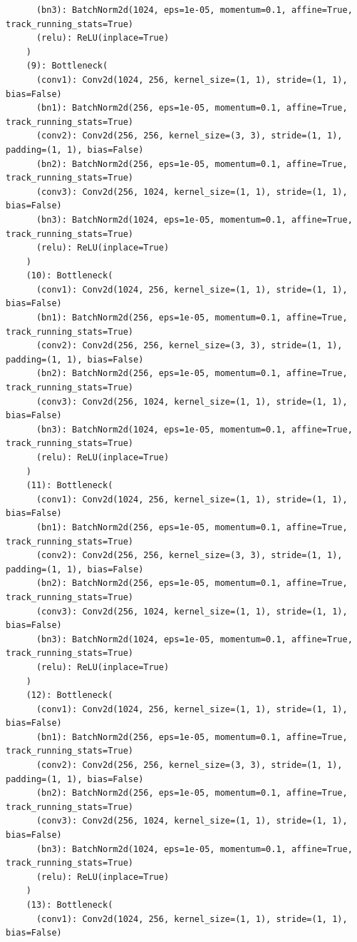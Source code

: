 \documentclass{article}
\begin{document}
\begin{verbatim}
      (bn3): BatchNorm2d(1024, eps=1e-05, momentum=0.1, affine=True, track_running_stats=True)
      (relu): ReLU(inplace=True)
    )
    (9): Bottleneck(
      (conv1): Conv2d(1024, 256, kernel_size=(1, 1), stride=(1, 1), bias=False)
      (bn1): BatchNorm2d(256, eps=1e-05, momentum=0.1, affine=True, track_running_stats=True)
      (conv2): Conv2d(256, 256, kernel_size=(3, 3), stride=(1, 1), padding=(1, 1), bias=False)
      (bn2): BatchNorm2d(256, eps=1e-05, momentum=0.1, affine=True, track_running_stats=True)
      (conv3): Conv2d(256, 1024, kernel_size=(1, 1), stride=(1, 1), bias=False)
      (bn3): BatchNorm2d(1024, eps=1e-05, momentum=0.1, affine=True, track_running_stats=True)
      (relu): ReLU(inplace=True)
    )
    (10): Bottleneck(
      (conv1): Conv2d(1024, 256, kernel_size=(1, 1), stride=(1, 1), bias=False)
      (bn1): BatchNorm2d(256, eps=1e-05, momentum=0.1, affine=True, track_running_stats=True)
      (conv2): Conv2d(256, 256, kernel_size=(3, 3), stride=(1, 1), padding=(1, 1), bias=False)
      (bn2): BatchNorm2d(256, eps=1e-05, momentum=0.1, affine=True, track_running_stats=True)
      (conv3): Conv2d(256, 1024, kernel_size=(1, 1), stride=(1, 1), bias=False)
      (bn3): BatchNorm2d(1024, eps=1e-05, momentum=0.1, affine=True, track_running_stats=True)
      (relu): ReLU(inplace=True)
    )
    (11): Bottleneck(
      (conv1): Conv2d(1024, 256, kernel_size=(1, 1), stride=(1, 1), bias=False)
      (bn1): BatchNorm2d(256, eps=1e-05, momentum=0.1, affine=True, track_running_stats=True)
      (conv2): Conv2d(256, 256, kernel_size=(3, 3), stride=(1, 1), padding=(1, 1), bias=False)
      (bn2): BatchNorm2d(256, eps=1e-05, momentum=0.1, affine=True, track_running_stats=True)
      (conv3): Conv2d(256, 1024, kernel_size=(1, 1), stride=(1, 1), bias=False)
      (bn3): BatchNorm2d(1024, eps=1e-05, momentum=0.1, affine=True, track_running_stats=True)
      (relu): ReLU(inplace=True)
    )
    (12): Bottleneck(
      (conv1): Conv2d(1024, 256, kernel_size=(1, 1), stride=(1, 1), bias=False)
      (bn1): BatchNorm2d(256, eps=1e-05, momentum=0.1, affine=True, track_running_stats=True)
      (conv2): Conv2d(256, 256, kernel_size=(3, 3), stride=(1, 1), padding=(1, 1), bias=False)
      (bn2): BatchNorm2d(256, eps=1e-05, momentum=0.1, affine=True, track_running_stats=True)
      (conv3): Conv2d(256, 1024, kernel_size=(1, 1), stride=(1, 1), bias=False)
      (bn3): BatchNorm2d(1024, eps=1e-05, momentum=0.1, affine=True, track_running_stats=True)
      (relu): ReLU(inplace=True)
    )
    (13): Bottleneck(
      (conv1): Conv2d(1024, 256, kernel_size=(1, 1), stride=(1, 1), bias=False)

\end{verbatim}
\end{document}
